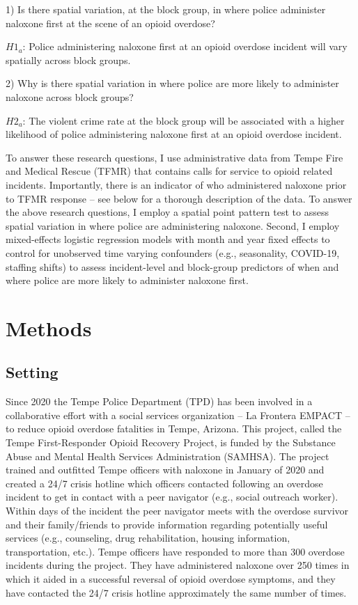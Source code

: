 1) Is there spatial variation, at the block group, in where police administer naloxone first at the scene of an opioid overdose? 

\begin{flushleft}
\(H1_a\): Police administering naloxone first at an opioid overdose incident will vary spatially across block groups. 
\end{flushleft}

2) Why is there spatial variation in where police are more likely to administer naloxone across block groups? 

\begin{flushleft}
\(H2_a\): The violent crime rate at the block group will be associated with a higher likelihood of police administering naloxone first at an opioid overdose incident.
\end{flushleft}

To answer these research questions, I use administrative data from Tempe Fire and Medical Rescue (TFMR) that contains calls for service to opioid related incidents. Importantly, there is an indicator of who administered naloxone prior to TFMR response -- see below for a thorough description of the data. To answer the above research questions, I employ a spatial point pattern test to assess spatial variation in where police are administering naloxone. Second, I employ mixed-effects logistic regression models with month and year fixed effects to control for unobserved time varying confounders (e.g., seasonality, COVID-19, staffing shifts) to assess incident-level and block-group predictors of when and where police are more likely to administer naloxone first.

\section{Methods}
\subsection{Setting}

Since 2020 the Tempe Police Department (TPD) has been involved in a collaborative effort with a social services organization – La Frontera EMPACT – to reduce opioid overdose fatalities in Tempe, Arizona. This project, called the Tempe First-Responder Opioid Recovery Project, is funded by the Substance Abuse and Mental Health Services Administration (SAMHSA). The project trained and outfitted Tempe officers with naloxone in January of 2020 and created a 24/7 crisis hotline which officers contacted following an overdose incident to get in contact with a peer navigator (e.g., social outreach worker). Within days of the incident the peer navigator meets with the overdose survivor and their family/friends to provide information regarding potentially useful services (e.g., counseling, drug rehabilitation, housing information, transportation, etc.). Tempe officers have responded to more than 300 overdose incidents during the project. They have administered naloxone over 250 times in which it aided in a successful reversal of opioid overdose symptoms, and they have contacted the 24/7 crisis hotline approximately the same number of times. 

